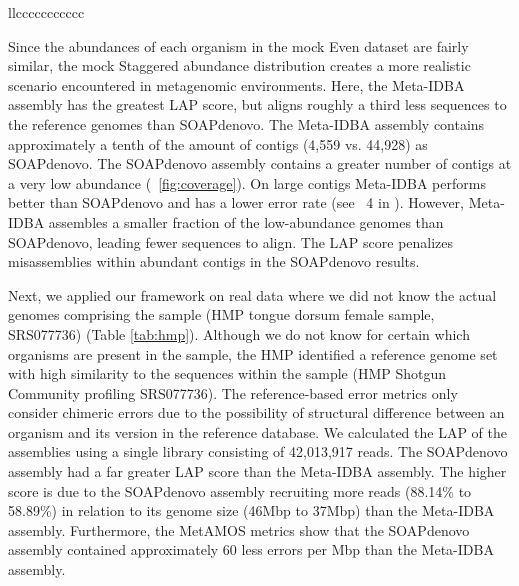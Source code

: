 \documentclass[12pt,\mydriver]{thesis}
\begin{document}
\begin{landscape}
\begin{table}[tbp]
\begin{tabular}{{l}{l}{c}{c}{c}{c}{c}{c}{c}{c}{c}{c}{c}}
\hline
\end{tabular}
\caption[Comparison of assembly statistics for HMP mock Even and mock Staggered datasets]{Comparison of assembly statistics for HMP mock Even and mock Staggered datasets.Numbers in bold represent the best value for the specific dataset.}
\label{tab:hmp}
\end{table}

\renewcommand{\baselinestretch}{2}
\small\normalsize
\end{landscape}


Since the abundances of each organism in the mock Even dataset are fairly similar, the mock Staggered abundance distribution creates a more realistic scenario encountered in metagenomic environments.
Here, the Meta-IDBA assembly has the greatest LAP score, but aligns roughly a third less sequences to the reference genomes than SOAPdenovo.
The Meta-IDBA assembly contains approximately a tenth of the amount of contigs (4,559 vs. 44,928) as SOAPdenovo.
The SOAPdenovo assembly contains a greater number of contigs at a very low abundance (\figurename~\ref{fig:coverage}).
On large contigs Meta-IDBA performs better than SOAPdenovo and has a lower error rate (see \figurename~4 in \cite{treangen2013metamos}).
However, Meta-IDBA assembles a smaller fraction of the low-abundance genomes than SOAPdenovo, leading fewer sequences to align.
The LAP score penalizes misassemblies within abundant contigs in the SOAPdenovo results.




Next, we applied our framework on real data where we did not know the actual genomes comprising the sample (HMP tongue dorsum female sample, SRS077736) (Table \ref{tab:hmp}).
Although we do not know for certain which organisms are present in the sample, the HMP identified a reference genome set with high similarity to the sequences within the sample (HMP Shotgun Community profiling SRS077736).
The reference-based error metrics only consider chimeric errors due to the possibility of structural difference between an organism and its version in the reference database.
We calculated the LAP of the assemblies using a single library consisting of 42,013,917 reads.
The SOAPdenovo assembly had a far greater LAP score than the Meta-IDBA assembly.
The higher score is due to the SOAPdenovo assembly recruiting more reads (88.14\% to 58.89\%) in relation to its genome size (46Mbp to 37Mbp) than the Meta-IDBA assembly.
Furthermore, the MetAMOS metrics show that the SOAPdenovo assembly contained approximately 60 less errors per Mbp than the Meta-IDBA assembly.
\end{document}
